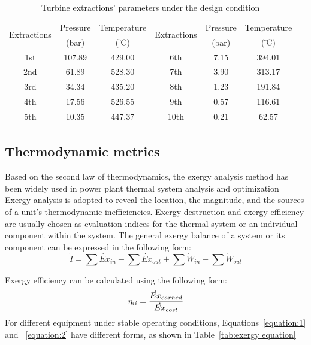 \documentclass[preprint,12pt]{elsarticle}
\begin{document}
\begin{table}
\caption{Turbine extractions' parameters under the design condition}
\label{table:extractions_parameter}
\begin{centering}
\begin{tabular}{cccccc}
\toprule 
\multirow{2}{*}{Extractions} & Pressure & Temperature & \multirow{2}{*}{Extractions} & Pressure & Temperature\tabularnewline
 & (bar) & (℃) &  & (bar) & (℃)\tabularnewline
\midrule
1st & 107.89  & 429.00 & 6th & 7.15  & 394.01 \tabularnewline
2nd & 61.89 & 528.30  & 7th & 3.90  & 313.17\tabularnewline
3rd & 34.34 & 435.20  & 8th & 1.23  & 191.84\tabularnewline
4th & 17.56  & 526.55  & 9th & 0.57  & 116.61\tabularnewline
5th & 10.35  & 447.37 & 10th & 0.21 & 62.57\tabularnewline
\bottomrule
\end{tabular}
\par\end{centering}
\end{table}

\subsection{Thermodynamic metrics} %
\label{ssub3:analsys method} 
Based on the second law of thermodynamics, the exergy analysis method has been widely used in power plant thermal system analysis and optimization~\cite{Si2017Exergy,Yang2013Comprehensive,Ahmadi2016Energy}
Exergy analysis is adopted to reveal the location, the magnitude, and the sources of a unit's thermodynamic inefficiencies.
Exergy destruction and exergy efficiency are usually chosen as evaluation indices for the thermal system or an individual component within the system. 
The general exergy balance of a system or its component can be expressed in the following form:
\begin{equation}
\label{equation:1}
\dot{I}=\sum\dot{Ex}{}_{in}-\sum\dot{Ex}{}_{out}+\sum\dot{W}{}_{in}-\sum\dot{W}{}_{out}
\end{equation}





Exergy efficiency can be calculated using the following form:
\begin{equation}
\label{equation:2}
\eta_{\uppercase\expandafter{\romannumeral2}}=\frac{\dot{Ex}{}_{earned}}{\dot{Ex}{}_{cost}}
\end{equation}
For different equipment under stable operating conditions, Equations~\ref{equation:1} and ~\ref{equation:2} have different forms, as shown in Table~\ref{tab:exergy equation}~\cite{Aljundi2009Energy}
\end{document}
